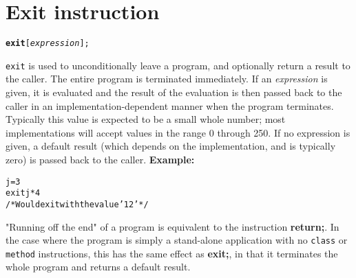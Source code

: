 \chapter{Exit instruction}\label{"id"}
\begin{shaded}
\begin{alltt}
\textbf{exit} [\emph{expression}];
\end{alltt}
\end{shaded}
 \texttt{exit} is used to unconditionally leave a program, and
optionally return a result to the caller.
The entire program is terminated immediately.
 If an \emph{expression} is given, it is evaluated and the result
of the evaluation is then passed back to the caller in an
implementation-dependent manner when the program terminates.
Typically this value is expected to be a small whole number; most
implementations will accept values in the range 0 through 250.
If no expression is given, a default result (which depends on the
implementation, and is typically zero) is passed back to the caller.
 \textbf{Example:}
\begin{alltt}
j=3
exit j*4
/* Would exit with the value '12' */
\end{alltt}
 "Running off the end" of a program is equivalent to the
instruction \textbf{return;}.  In the case where the program is simply
a stand-alone application with no \texttt{class} or \texttt{method}
instructions, this has the same effect as \textbf{exit;}, in that it
terminates the whole program and returns a default result.
